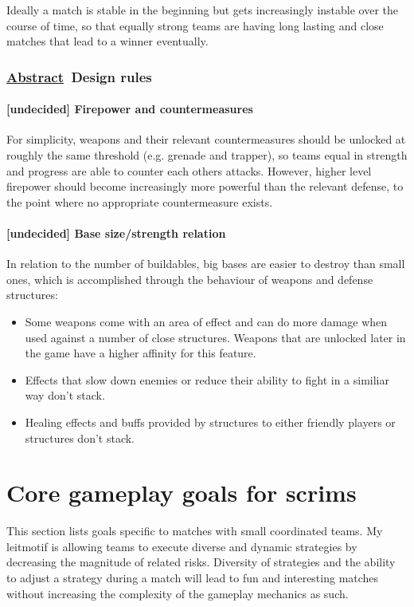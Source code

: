 \documentclass{scrartcl}
\newcommand{\abstrac}  [0]{\textbf{\underline{Abstract}\ }}
\newcommand{\undecided}[0]{\textcolor{undecided}{\textbf{[undecided] }}}
\begin{document}
Ideally a match is stable in the beginning but gets increasingly instable over the course of time, so that equally strong teams are having long lasting and close matches that lead to a winner eventually.

\subsubsection{\abstrac Design rules}

\paragraph{\undecided Firepower and countermeasures}

For simplicity, weapons and their relevant countermeasures should be unlocked at roughly the same threshold (e.g. grenade and trapper), so teams equal in strength and progress are able to counter each others attacks. However, higher level firepower should become increasingly more powerful than the relevant defense, to the point where no appropriate countermeasure exists.

\paragraph{\undecided Base size/strength relation}

In relation to the number of buildables, big bases are easier to destroy than small ones, which is accomplished through the behaviour of weapons and defense structures:

\begin{itemize}
\item Some weapons come with an area of effect and can do more damage when used against a number of close structures. Weapons that are unlocked later in the game have a higher affinity for this feature.
\item Effects that slow down enemies or reduce their ability to fight in a similiar way don't stack.
\item Healing effects and buffs provided by structures to either friendly players or structures don't stack.
\end{itemize}

\section{Core gameplay goals for scrims}

This section lists goals specific to matches with small coordinated teams. My leitmotif is allowing teams to execute diverse and dynamic strategies by decreasing the magnitude of related risks. Diversity of strategies and the ability to adjust a strategy during a match will lead to fun and interesting matches without increasing the complexity of the gameplay mechanics as such.
\end{document}
